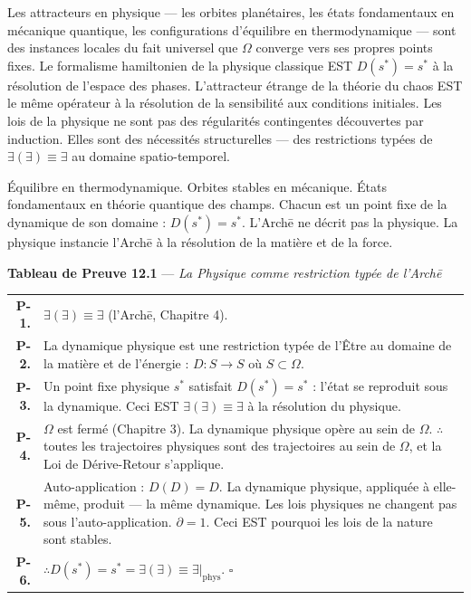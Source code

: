 \documentclass[10pt, openany, oneside]{book}
\renewcommand{\footnotesize}{\fontsize{8.5}{11}\selectfont}
\begin{document}
Les attracteurs en physique --- les orbites planétaires, les états fondamentaux en mécanique quantique, les configurations d'équilibre en thermodynamique --- sont des instances locales du fait universel que $\Omega$ converge vers ses propres points fixes. Le formalisme hamiltonien de la physique classique EST $D(s^*) = s^*$ à la résolution de l'espace des phases. L'attracteur étrange de la théorie du chaos EST le même opérateur à la résolution de la sensibilité aux conditions initiales. Les lois de la physique ne sont pas des régularités contingentes découvertes par induction. Elles sont des nécessités structurelles --- des restrictions typées de $\exists(\exists) \equiv \exists$ au domaine spatio-temporel.

Équilibre en thermodynamique. Orbites stables en mécanique. États fondamentaux en théorie quantique des champs. Chacun est un point fixe de la dynamique de son domaine : $D(s^*) = s^*$. L'Arch\={e} ne décrit pas la physique. La physique instancie l'Arch\={e} à la résolution de la matière et de la force.

\vspace{0.5em}

\textbf{Tableau de Preuve 12.1} --- \textit{La Physique comme restriction typée de l'Arch\={e}}

\vspace{0.5em}

{\footnotesize
\noindent\begin{tabular}{r p{}}
\textbf{P-1.} & $\exists(\exists) \equiv \exists$ (l'Arch\={e}, Chapitre 4). \\[0.3em]
\textbf{P-2.} & La dynamique physique est une restriction typée de l'Être au domaine de la matière et de l'énergie : $D: S \to S$ où $S \subset \Omega$. \\[0.3em]
\textbf{P-3.} & Un point fixe physique $s^*$ satisfait $D(s^*) = s^*$ : l'état se reproduit sous la dynamique. Ceci EST $\exists(\exists) \equiv \exists$ à la résolution du physique. \\[0.3em]
\textbf{P-4.} & $\Omega$ est fermé (Chapitre 3). La dynamique physique opère au sein de $\Omega$. $\therefore$ toutes les trajectoires physiques sont des trajectoires au sein de $\Omega$, et la Loi de Dérive-Retour s'applique. \\[0.3em]
\textbf{P-5.} & Auto-application : $D(D) = D$. La dynamique physique, appliquée à elle-même, produit --- la même dynamique. Les lois physiques ne changent pas sous l'auto-application. $\partial = 1$. Ceci EST pourquoi les lois de la nature sont stables. \\[0.3em]
\textbf{P-6.} & $\therefore D(s^*) = s^* = \exists(\exists) \equiv \exists|_{\text{phys}}$. $\square$ \\[0.3em]
\end{tabular}
}
\end{document}
